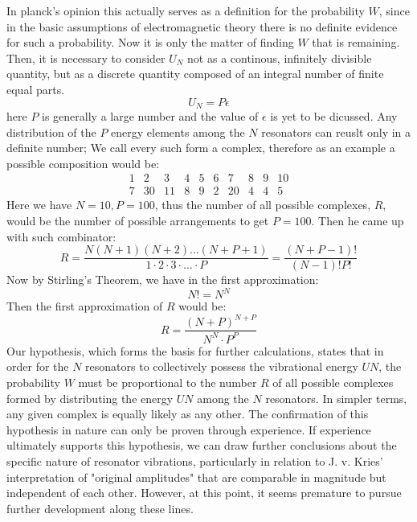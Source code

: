 \documentclass[9pt,a4paper, twocolumn]{article}
\newcounter{theo}
\begin{document}
            In planck's opinion this actually serves as a definition for the probability $W$, since in the basic assumptions of electromagnetic theory there is no definite evidence for such a probability. Now it is only the matter of finding $W$ that is remaining. Then, it is necessary to consider $U_N$ not as a continous, infinitely divisible quantity, but as a discrete quantity composed of an integral number of finite equal parts.
            \begin{equation}
                U_N = P\epsilon
            \end{equation}
            here $P$ is generally a large number and the value of $\epsilon$ is yet to be dicussed. Any distribution of the $P$ energy elements among the $N$ resonators can reuslt only in a definite number; We call every such form a complex, therefore as an example a possible composition would be:
            \begin{equation}
                \begin{matrix}
                    1 &2 &3&4&5&6&7&8&9&10\\
                    7 &30&11&8&9&2&20&4&4&5
                \end{matrix}
            \end{equation}
            Here we have $N=10, P=100$, thus the number of all possible complexes, $R$, would be the number of possible arrangements to get $P=100$. Then he came up with such combinator:
            \begin{equation}
                R = \frac{N(N+1)(N+2)\dots(N+P+1)}{1\cdot 2\cdot 3\cdot \dots\cdot P } = \frac{(N+P-1)!}{(N-1)!P!}
            \end{equation}
            Now by Stirling's Theorem, we have in the first approximation:
            $$
            N! = N^N
            $$
            Then the first approximation of $R$ would be:
            \begin{equation}
                R=\frac{(N+P)^{N+P}}{N^N\cdot P^P}
            \end{equation}
            Our hypothesis, which forms the basis for further calculations, states that in order for the $N$ resonators to collectively possess the vibrational energy $UN$, the probability $W$ must be proportional to the number $R$ of all possible complexes formed by distributing the energy $UN$ among the $N$ resonators. In simpler terms, any given complex is equally likely as any other. The confirmation of this hypothesis in nature can only be proven through experience. If experience ultimately supports this hypothesis, we can draw further conclusions about the specific nature of resonator vibrations, particularly in relation to J. v. Kries' interpretation of "original amplitudes" that are comparable in magnitude but independent of each other. However, at this point, it seems premature to pursue further development along these lines.
\end{document}
